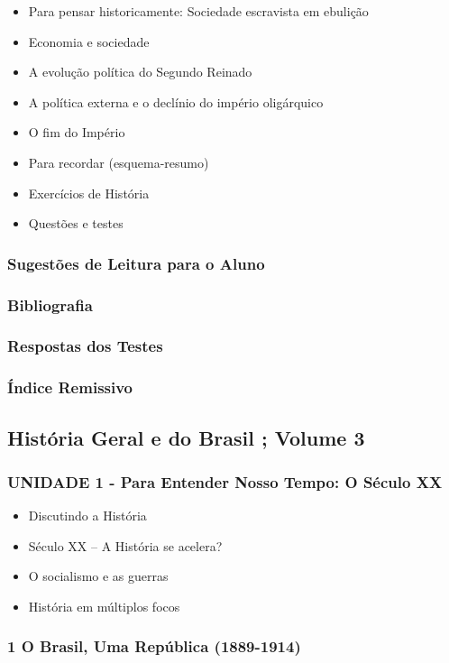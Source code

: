 \documentclass[a4paper,12pt]{article}[abntex2]
\begin{document}
\begin{itemize}
\item Para pensar historicamente: Sociedade escravista em ebulição
\item Economia e sociedade
\item A evolução política do Segundo Reinado
\item A política externa e o declínio do império oligárquico
\item O fim do Império
\item Para recordar (esquema-resumo)
\item Exercícios de História
\item Questões e testes
\end{itemize}
\subsubsection*{Sugestões de Leitura para o Aluno}

\subsubsection*{Bibliografia}

\subsubsection*{Respostas dos Testes}

\subsubsection*{Índice Remissivo}

\subsection{História Geral e do Brasil ; Volume 3}
\subsubsection*{UNIDADE 1 - Para Entender Nosso Tempo: O Século XX}

\begin{itemize}
\item Discutindo a História
\item Século XX – A História se acelera?
\item O socialismo e as guerras
\item História em múltiplos focos
\end{itemize}
\subsubsection*{1 O Brasil, Uma República (1889-1914)}
\end{document}
